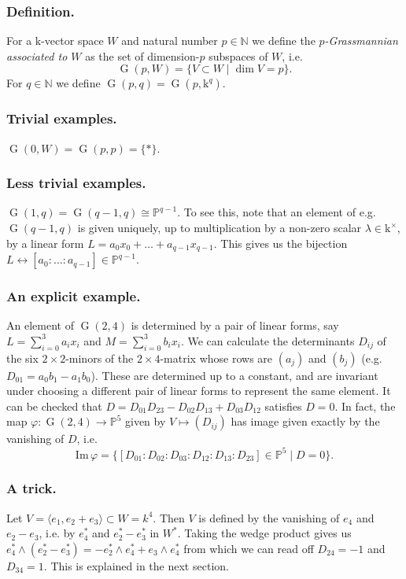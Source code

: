 \documentclass[10pt]{article}
\numberwithin{equation}{subsubsection}
\DeclareMathOperator{\G}{G}
\newcommand{\N}{\mathbb{N}}
\renewcommand{\P}{\mathbb{P}}
\renewcommand{\k}{\mathrm{k}}
\renewcommand{\Im}{\mathrm{Im}\,}
\begin{document}
            \subsubsection{Definition.} For a $\k$-vector space $W$ and natural number $p\in\N$ we define the \textit{$p$-Grassmannian associated to $W$} as the set of dimension-$p$ subspaces of $W$, i.e. \[\G(p,W)=\{V\subset W \mid \dim V=p\}.\]
                For $q\in\N$ we define $\G(p,q)=\G(p,\k^q)$.
            
            \subsubsection{Trivial examples.} $\G(0,W)=\G(p,p)=\{*\}$.
            
            \subsubsection{Less trivial examples.} $\G(1,q)=\G(q-1,q)\cong\P^{q-1}$. To see this, note that an element of e.g. $\G(q-1,q)$ is given uniquely, up to multiplication by a non-zero scalar $\lambda\in\k^\times$, by a linear form $L=a_0x_0+\ldots+a_{q-1}x_{q-1}$. This gives us the bijection $L\leftrightarrow[a_0:\ldots:a_{q-1}]\in\P^{q-1}$.
            
            \subsubsection{An explicit example.} An element of $\G(2,4)$ is determined by a pair of linear forms, say $L=\sum_{i=0}^3 a_ix_i$ and $M=\sum_{i=0}^3 b_ix_i$. We can calculate the determinants $D_{ij}$ of the six $2\times2$-minors of the $2\times4$-matrix whose rows are $(a_j)$ and $(b_j)$ (e.g. $D_{01}=a_0b_1-a_1b_0$). These are determined up to a constant, and are invariant under choosing a different pair of linear forms to represent the same element. It can be checked that $D=D_{01}D_{23}-D_{02}D_{13}+D_{03}D_{12}$ satisfies $D=0$. In fact, the map $\varphi\colon\G(2,4)\to\P^5$ given by $V\mapsto(D_{ij})$ has image given exactly by the vanishing of $D$, i.e. \[\Im\varphi = \{[D_{01}:D_{02}:D_{03}:D_{12}:D_{13}:D_{23}]\in\P^5 \mid D=0\}.\]
            
            \subsubsection{A trick.}\label{a-trick} Let $V=\langle e_1,e_2+e_3\rangle\subset W=k^4$. Then $V$ is defined by the vanishing of $e_4$ and $e_2-e_3$, i.e. by $e_4^*$ and $e_2^*-e_3^*$ in $W^*$. Taking the wedge product gives us $e_4^*\wedge (e_2^*-e_3^*) = -e_2^*\wedge e_4^* + e_3\wedge e_4^*$ from which we can read off $D_{24}=-1$ and $D_{34}=1$. This is explained in the next section.
        
\end{document}
